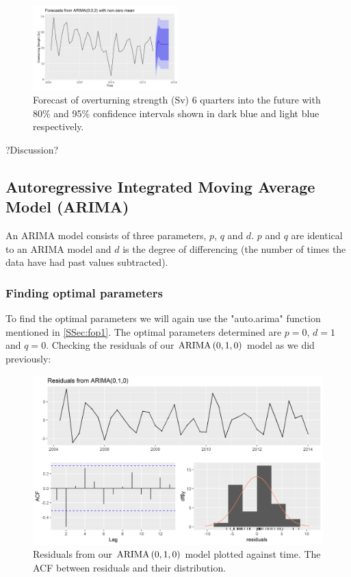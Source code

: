 \begin{figure}[H]
    \centering
    \includegraphics[width=0.50\textwidth]{Sections/ARIMA/Plots/forecast.png}
    \caption{Forecast of overturning strength (Sv) 6 quarters into the future with 80\% and 95\% confidence intervals shown in dark blue and light blue respectively.}
    \label{S2fig:ARMA forecast}
\end{figure}

?Discussion?

\subsection{Autoregressive Integrated Moving Average Model (ARIMA)}

An ARIMA model consists of three parameters, $p$, $q$ and $d$. $p$ and $q$ are identical to an ARIMA model and $d$ is the degree of differencing (the number of times the data have had past values subtracted). 

\subsubsection{Finding optimal parameters}

To find the optimal parameters we will again use the "auto.arima" function mentioned in \autoref{SSec:fop1}.
\nline
The optimal parameters determined are $p=0$, $d=1$ and $q=0$. Checking the residuals of our $\text{ARIMA}\left(0,1,0\right)$ model as we did previously:

\begin{figure}[H]
    \centering
    \includegraphics[width=\sTwoRes\textwidth]{Sections/ARIMA/Plots/auto__arima_res.png}
    \caption{Residuals from our $\text{ARIMA}\left(0,1,0\right)$ model plotted against time. The ACF between residuals and their distribution.}
    \label{S2fig:arima_res}
\end{figure}

